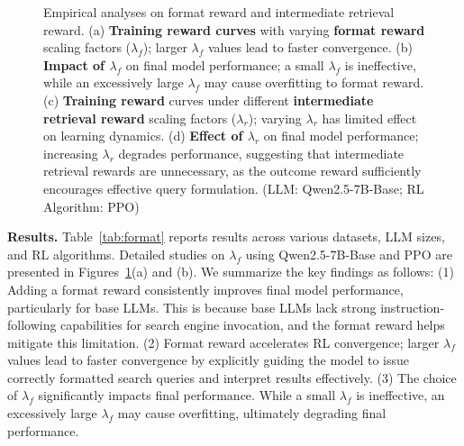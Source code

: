 \begin{figure}[t]
    \centering
    \caption{
Empirical analyses on format reward and intermediate retrieval reward.
(a) \textbf{Training reward curves} with varying \textbf{format reward} scaling factors ($\lambda_f$); larger $\lambda_f$ values lead to faster convergence.
(b) \textbf{Impact of $\lambda_f$} on final model performance; a small $\lambda_f$ is ineffective, while an excessively large $\lambda_f$ may cause overfitting to format reward.
(c) \textbf{Training reward} curves under different \textbf{intermediate retrieval reward} scaling factors ($\lambda_r$); varying $\lambda_r$ has limited effect on learning dynamics.
(d) \textbf{Effect of $\lambda_r$} on final model performance; increasing $\lambda_r$ degrades performance, suggesting that intermediate retrieval rewards are unnecessary, as the outcome reward sufficiently encourages effective query formulation.
(LLM: Qwen2.5-7B-Base; RL Algorithm: PPO)
}\label{fig:format-ret-reward}
\end{figure}

\textbf{Results.} 
Table~\ref{tab:format} reports results across various datasets, LLM sizes, and RL algorithms.
Detailed studies on $\lambda_f$ using Qwen2.5-7B-Base and PPO are presented in Figures~\ref{fig:format-ret-reward}(a) and (b).
We summarize the key findings as follows:
(1) Adding a format reward consistently improves final model performance, particularly for base LLMs. 
This is because base LLMs lack strong instruction-following capabilities for search engine invocation, and the format reward helps mitigate this limitation.
(2) Format reward accelerates RL convergence; larger $\lambda_f$ values lead to faster convergence by explicitly guiding the model to issue correctly formatted search queries and interpret results effectively.
(3) The choice of $\lambda_f$ significantly impacts final performance. While a small $\lambda_f$ is ineffective, an excessively large $\lambda_f$ may cause overfitting, ultimately degrading final performance.

